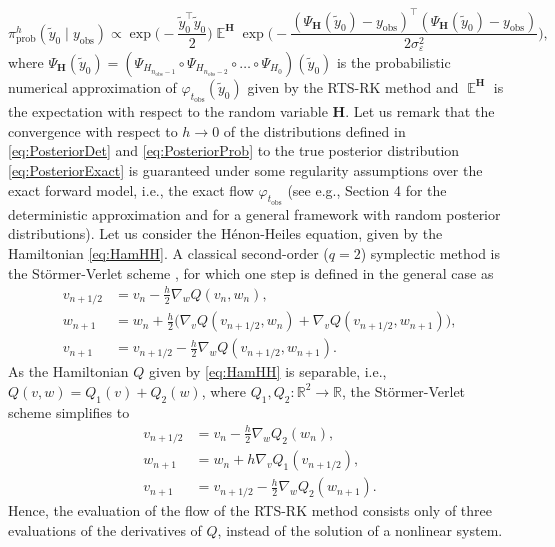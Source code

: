 \documentclass{siamart1116}
\numberwithin{theorem}{section}
\renewcommand{\phi}{\varphi}
\newcommand{\R}{\mathbb{R}}
\newcommand{\epl}{\varepsilon}
\newcommand{\E}{\operatorname{\mathbb{E}}}
\begin{document}
\begin{equation}\label{eq:PosteriorProb}
	\pi^h_{\mathrm{prob}}(\tilde y_0 \mid y_{\mathrm{obs}}) \propto \exp\Big(-\frac{\tilde y_0^\top \tilde y_0}{2}\Big) \E^{\mathbf{H}} \exp\Big(-\frac{(\Psi_\mathbf{H}(\tilde y_0) - y_{\mathrm{obs}})^\top(\Psi_\mathbf{H}(\tilde y_0) - y_{\mathrm{obs}})}{2\sigma_\epl^2}\Big),
\end{equation}
where $\Psi_\mathbf H(\tilde y_0) = (\Psi_{H_{n_{\mathrm{obs}}-1}} \circ \Psi_{H_{n_{\mathrm{obs}}-2}} \circ \ldots \circ \Psi_{H_0})(\tilde y_0)$ is the probabilistic numerical approximation of $\phi_{t_{\mathrm{obs}}}(\tilde y_0)$ given by the RTS-RK method and $\E^\mathbf{H}$ is the expectation with respect to the random variable $\mathbf{H}$. Let us remark that the convergence with respect to $h \to 0$ of the distributions defined in \eqref{eq:PosteriorDet} and \eqref{eq:PosteriorProb} to the true posterior distribution \eqref{eq:PosteriorExact} is guaranteed under some regularity assumptions over the exact forward model, i.e., the exact flow $\phi_{t_{\mathrm{obs}}}$ (see e.g., \cite{Stu10} Section 4 for the deterministic approximation and \cite{LST17} for a general framework with random posterior distributions).
Let us consider the Hénon-Heiles equation, given by the Hamiltonian \eqref{eq:HamHH}. A classical second-order ($q = 2$) symplectic method is the Störmer-Verlet scheme \cite{Sto07, Ver67, HLW06}, for which one step is defined in the general case as
\begin{equation}
\begin{aligned}
	v_{n+1/2} &= v_n - \frac{h}{2} \nabla_w Q(v_n, w_n), \\
	w_{n+1} &= w_n + \frac{h}{2} \big(\nabla_v Q(v_{n+1/2}, w_n) + \nabla_v Q(v_{n+1/2}, w_{n+1})\big),\\
	v_{n+1} &= v_{n+1/2} - \frac{h}{2} \nabla_w Q(v_{n+1/2}, w_{n+1}).
\end{aligned}
\end{equation}
As the Hamiltonian $Q$ given by \eqref{eq:HamHH} is separable, i.e., $Q(v, w) = Q_1(v) + Q_2(w)$, where $Q_1, Q_2 \colon \R^2 \to \R$, the Störmer-Verlet scheme simplifies to
\begin{equation}
\begin{aligned}
	v_{n+1/2} &= v_n - \frac{h}{2} \nabla_w Q_2(w_n), \\
	w_{n+1} &= w_n + h \nabla_v Q_1(v_{n+1/2}),\\
	v_{n+1} &= v_{n+1/2} - \frac{h}{2} \nabla_w Q_2(w_{n+1}).
\end{aligned}
\end{equation}
Hence, the evaluation of the flow of the RTS-RK method consists only of three evaluations of the derivatives of $Q$, instead of the solution of a nonlinear system. 
\end{document}
